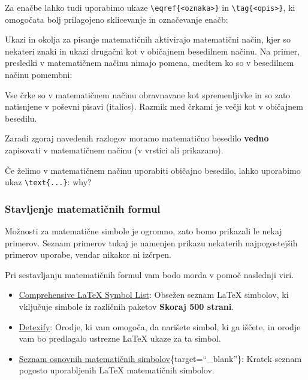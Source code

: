 \begin{example}\label{eg_matematika_equation_1}\end{example}Za enačbe lahko tudi uporabimo ukaze \texttt{{\textbackslash}eqref\{\textless oznaka\textgreater \}} in \texttt{{\textbackslash}tag\{\textless opis\textgreater \}}, ki omogočata bolj prilagojeno sklicevanje in označevanje enačb:

\begin{example}\label{eg_matematika_equation_2}\end{example}\begin{example}\label{eg_matematika_equation_3}\end{example}Ukazi in okolja za pisanje matematičnih aktivirajo matematični način, kjer so nekateri znaki in ukazi drugačni kot v običajnem besedilnem načinu. Na primer, presledki v matematičnem načinu nimajo pomena, medtem ko so v besedilnem načinu pomembni:

Vse črke so v matematičnem načinu obravnavane kot spremenljivke in so zato natisnjene v poševni pisavi (italics). Razmik med črkami je večji kot v običajnem besedilu.

Zaradi zgoraj navedenih razlogov moramo matematično besedilo \textbf{vedno} zapisovati v matematičnem načinu (v vrstici ali prikazano).

Če želimo v matematičnem načinu uporabiti običajno besedilo, lahko uporabimo ukaz \texttt{{\textbackslash}text\{...\}}: why?

\subsubsection{Stavljenje matematičnih formul}

Možnosti za matematične simbole je ogromno, zato bomo prikazali le nekaj
primerov.
Seznam primerov tukaj je namenjen prikazu nekaterih najpogostejših primerov uporabe, vendar nikakor ni izčrpen.

Pri sestavljanju matematičnih formul vam bodo morda v pomoč naslednji viri.

\begin{itemize}
\item \href{https://tug.ctan.org/info/symbols/comprehensive/symbols-a4.pdf}{Comprehensive LaTeX Symbol List}: Obsežen seznam LaTeX simbolov, ki vključuje simbole iz različnih paketov \textbf{Skoraj 500 strani}.
\item \href{http://detexify.kirelabs.org/classify.html}{Detexify}: Orodje, ki vam omogoča, da narišete simbol, ki ga iščete, in orodje vam bo predlagalo ustrezne LaTeX ukaze za ta simbol.
\item \href{./img/04\_seznamSimbolov.pdf}{Seznam osnovnih matematičnih simbolov}\{target=``\_blank''\}: Kratek seznam pogosto uporabljenih LaTeX matematičnih simbolov.
\end{itemize}

